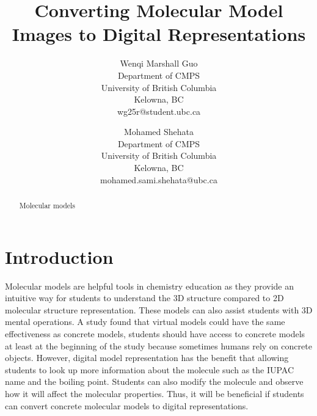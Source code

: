 \documentclass{article}
\begin{document}
\title{Converting Molecular Model Images to Digital Representations}


\author{Wenqi Marshall Guo\\
Department of CMPS\\
University of British Columbia\\
Kelowna, BC\\
wg25r@student.ubc.ca 
\and
Mohamed Shehata\\
Department of CMPS\\
University of British Columbia\\
Kelowna, BC\\
mohamed.sami.shehata@ubc.ca
}

\maketitle


\begin{abstract}
Molecular models 
\end{abstract}


\section{Introduction}
Molecular models are helpful tools in chemistry education as they provide an intuitive way for students to understand the 3D structure compared to 2D molecular structure representation. These models can also assist students with 3D mental operations. 
A study \autocite{savec_evaluating_2005} found that virtual models could have the same effectiveness as concrete models, students should have access to concrete models at least at the beginning of the study because sometimes humans rely on concrete objects.  
However, digital model representation has the benefit that allowing students to look up more information about the molecule such as the IUPAC name and the boiling point. Students can also modify the molecule and observe how it will affect the molecular properties. Thus, it will be beneficial if students can convert concrete molecular models to digital representations. 
\end{document}
